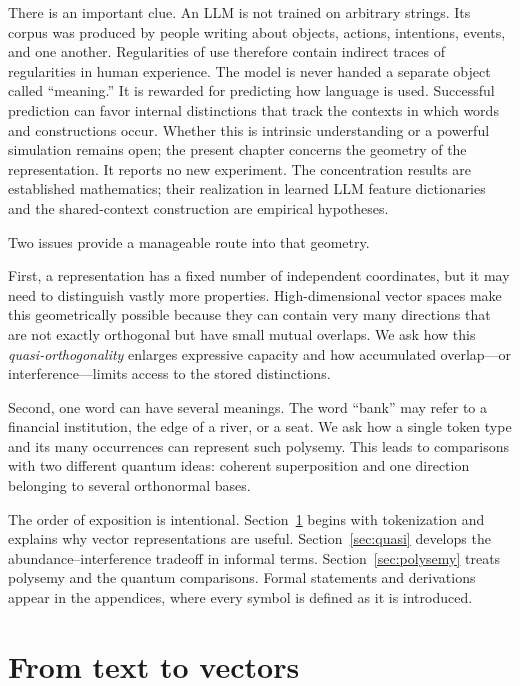 \documentclass[
  aps,
  reprint,
  superscriptaddress,
  floatfix,
  nofootinbib,
  longbibliography
]{revtex4-2}
\begin{document}
There is an important clue.  An LLM is not trained on arbitrary strings.
Its corpus was produced by people writing about objects, actions, intentions,
events, and one another.  Regularities of use therefore contain indirect
traces of regularities in human experience.  The model is never handed a
separate object called ``meaning.''  It is rewarded for predicting how
language is used.  Successful prediction can favor internal distinctions that
track the contexts in which words and constructions occur.  Whether this is
intrinsic understanding or a powerful simulation remains open; the present
chapter concerns the geometry of the representation.  It reports no new
experiment.  The concentration results are established mathematics; their
realization in learned LLM feature dictionaries and the shared-context
construction are empirical hypotheses.

Two issues provide a manageable route into that geometry.

First, a representation has a fixed number of independent coordinates, but it
may need to distinguish vastly more properties.  High-dimensional vector
spaces make this geometrically possible because they can contain very many directions that
are not exactly orthogonal but have small mutual overlaps.  We ask how this
\emph{quasi-orthogonality} enlarges expressive capacity and how accumulated
overlap---or interference---limits access to the stored distinctions.

Second, one word can have several meanings.  The word ``bank'' may refer to a
financial institution, the edge of a river, or a seat.  We ask how a single
token type and its many occurrences can represent such polysemy.  This leads
to comparisons with two different quantum ideas: coherent superposition and
one direction belonging to several orthonormal bases.

The order of exposition is intentional.  Section~\ref{sec:vectors} begins
with tokenization and explains why vector representations are useful.
Section~\ref{sec:quasi} develops the abundance--interference tradeoff in
informal terms.  Section~\ref{sec:polysemy} treats polysemy and the quantum
comparisons.  Formal statements and derivations appear in the appendices,
where every symbol is defined as it is introduced.

\section{From text to vectors}
\label{sec:vectors}
\end{document}
